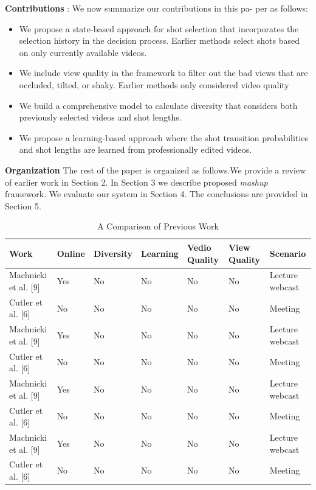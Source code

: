 \documentclass{sig-alternate}
\begin{document}
\textbf{Contributions} : We now summarize our contributions in this pa-
per as follows:
\begin{itemize}
    \item We propose a state-based approach for shot selection that incorporates the selection history in the decision process. Earlier methods select shots based on only currently available videos.
    \item We include view quality in the framework to filter out the bad views that are occluded, tilted, or shaky. Earlier methods only considered video quality
    \item We build a comprehensive model to calculate diversity that considers both previously selected videos and shot lengths.
    \item We propose a learning-based approach where the shot transition probabilities and shot lengths are learned from professionally edited videos.
\end{itemize}
\textbf{Organization} The rest of the paper is organized as follows.We provide a review of earlier work in Section 2. In Section 3 we describe proposed \textit{mashup} framework. We evaluate our system in Section 4. The conclusions are provided in Section 5.
\begin{table}[t]
  \centering
  \caption{A Comparison of Previous Work}
  \begin{tabular}{l|l|l|l|l|l|l}
  \hline
   Work & Online & Diversity & Learning & Vedio Quality & View Quality & Scenario \\\hline
   Machnicki et al. [9]& Yes& No& No& No& No& Lecture webcast\\\hline
    Cutler et al. [6]& No& No& No &No& No& Meeting\\\hline
     Machnicki et al. [9]& Yes& No& No& No& No& Lecture webcast\\\hline
    Cutler et al. [6]& No& No& No &No& No& Meeting\\\hline
     Machnicki et al. [9]& Yes& No& No& No& No& Lecture webcast\\\hline
    Cutler et al. [6]& No& No& No &No& No& Meeting\\\hline
     Machnicki et al. [9]& Yes& No& No& No& No& Lecture webcast\\\hline
    Cutler et al. [6]& No& No& No &No& No& Meeting\\\hline
  \end{tabular}
  
  \label{tab:1}
\end{table}
\end{document}
